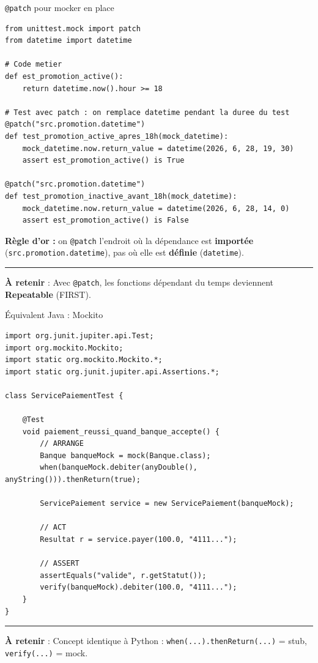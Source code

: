 \documentclass[aspectratio=169,11pt]{beamer}
\newcommand{\takeaway}[1]{%
\vfill\begin{beamercolorbox}[wd=\linewidth,sep=0.4em]{}
\color{accent2}\rule[0.6ex]{1.2em}{1.2pt}\hspace{0.4em}%
\textbf{\color{accent2}\small À retenir} \textcolor{textsoft}{:} %
{\small\color{textmain}#1}
\end{beamercolorbox}}
\begin{document}
\begin{frame}[fragile,t,shrink=15]{\texttt{@patch} pour mocker en place}
\begin{lstlisting}[style=pythondark]
from unittest.mock import patch
from datetime import datetime

# Code metier
def est_promotion_active():
    return datetime.now().hour >= 18

# Test avec patch : on remplace datetime pendant la duree du test
@patch("src.promotion.datetime")
def test_promotion_active_apres_18h(mock_datetime):
    mock_datetime.now.return_value = datetime(2026, 6, 28, 19, 30)
    assert est_promotion_active() is True

@patch("src.promotion.datetime")
def test_promotion_inactive_avant_18h(mock_datetime):
    mock_datetime.now.return_value = datetime(2026, 6, 28, 14, 0)
    assert est_promotion_active() is False
\end{lstlisting}
\vspace{0.2cm}\footnotesize
\textbf{Règle d'or :} on \texttt{@patch} l'endroit où la dépendance est \textbf{importée} (\texttt{src.promotion.datetime}), pas où elle est \textbf{définie} (\texttt{datetime}).
\takeaway{Avec \texttt{@patch}, les fonctions dépendant du temps deviennent \textbf{Repeatable} (FIRST).}
\end{frame}

\begin{frame}[fragile,t,shrink=10]{\'Equivalent Java : Mockito}
\begin{lstlisting}[style=javadark]
import org.junit.jupiter.api.Test;
import org.mockito.Mockito;
import static org.mockito.Mockito.*;
import static org.junit.jupiter.api.Assertions.*;

class ServicePaiementTest {

    @Test
    void paiement_reussi_quand_banque_accepte() {
        // ARRANGE
        Banque banqueMock = mock(Banque.class);
        when(banqueMock.debiter(anyDouble(), anyString())).thenReturn(true);

        ServicePaiement service = new ServicePaiement(banqueMock);

        // ACT
        Resultat r = service.payer(100.0, "4111...");

        // ASSERT
        assertEquals("valide", r.getStatut());
        verify(banqueMock).debiter(100.0, "4111...");
    }
}
\end{lstlisting}
\takeaway{Concept identique à Python : \texttt{when(...).thenReturn(...)} = stub, \texttt{verify(...)} = mock.}
\end{frame}
\end{document}
